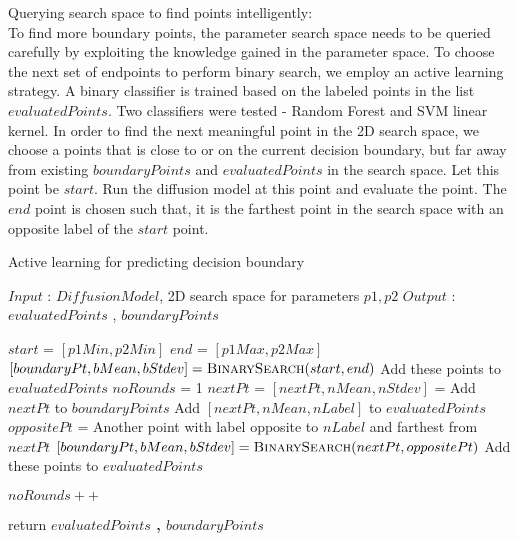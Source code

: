 Querying search space to find points intelligently:\\
To find more boundary points, the parameter search space needs to be queried carefully by exploiting the knowledge gained in the parameter space. To choose the next set of endpoints to perform binary search, we employ an active learning strategy. A binary classifier is trained based on the labeled points in the list $evaluatedPoints$. Two classifiers were tested - Random Forest and SVM linear kernel.
In order to find the next meaningful point in the 2D search space, we choose a points that is close to or on the current decision boundary, but far away from existing $boundaryPoints$ and $evaluatedPoints$ in the search space. 
Let this point be $start$. Run the diffusion model at this point and evaluate the point. The $end$ point is chosen such that, it is the farthest point in the search space with an opposite label of the $start$ point.

\begin{algorithm}

\caption{Active learning for predicting decision boundary}
\label{alg:methodAlgo}
\begin{algorithmic}[1]

\State $Input$ : $DiffusionModel$,
2D search space for parameters $p1,p2$ 
\State $Output$ : $evaluatedPoints$ , $boundaryPoints$

    \State $start$  = $[p1Min, p2Min]$
    \State $end$  = $[p1Max, p2Max]$
    \State $[boundaryPt, bMean, bStdev] = \Call{BinarySearch}{start,end}$
    \State {} Add these points to $evaluatedPoints$
    \State $noRounds$ = 1
        \State \textbf{\textit{$nextPt$}} = 
        \State $[nextPt, nMean, nStdev]$ = 
            \State Add $nextPt$ to $boundaryPoints$
        \Else 
            \State Add $[nextPt, nMean, nLabel]$ to $evaluatedPoints$
        \EndIf
        \State $oppositePt$ = Another point with label opposite to $nLabel$ and farthest from $nextPt$
        \State $[boundaryPt, bMean, bStdev] = \Call{BinarySearch}{nextPt,oppositePt}$
        \State {} Add these points to $evaluatedPoints$
        
        \State $noRounds++$
        
     \EndWhile
    
    \State return \textbf{$evaluatedPoints$ , $boundaryPoints$}

\EndProcedure
\end{algorithmic}
\end{algorithm}


